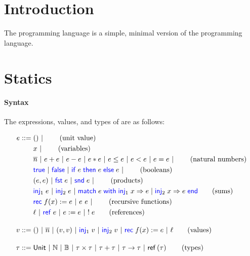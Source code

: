 \documentclass[10pt]{scrartcl}
\begin{document}

\author{Amin Timany}
\title{\miniML{}}

\maketitle

\section{Introduction}
\label{sec:intro}
The programming language \miniML{} is a simple, minimal version of the \ML{} programming language.

\section{Statics}
\label{sec:statics}

\paragraph{Syntax}
The expressions, values, and types of \miniML{} are as follows:

\begin{align*}
  \expr \BNFdef{}
  & \TT \ALT \tag{unit value} \\
  & \var \ALT \tag{variables} \\
  & \Num{n} \ALT \expr + \expr \ALT \expr - \expr \ALT \expr * \expr \ALT \expr \le \expr \ALT \expr < \expr \ALT \expr = \expr \ALT \tag{natural numbers}\\
  & \True \ALT \False \ALT \If \expr then \expr\; \Else \expr \ALT \tag{booleans} \\
  & (\expr, \expr) \ALT \Fst \expr \ALT \Snd \expr \ALT \tag{products} \\
  & \Inj{1} \expr \ALT \Inj{2} \expr \ALT \Match \expr with \Inj{1} \var => \expr | \Inj{2} \var => \expr end \tag{sums}\\
  & \Rec f \var := \expr \ALT \expr~\expr \ALT \tag{recursive functions}\\
  & \loc \ALT \alloc \expr \ALT \expr \store \expr \ALT \deref \expr \tag{references}\\[1em]
  \val \BNFdef{}
  & \TT \ALT \Num{n} \ALT (\val, \val) \ALT \Inj{1} \val \ALT \Inj{2} \val \ALT \Rec f \var := \expr \ALT \loc \tag{values}\\[1em]
  \typ \BNFdef{}
  & \Tunit \ALT \Tnat \ALT \Tbool \ALT \typ \times \typ \ALT \typ + \typ \ALT \typ \to \typ \ALT \Tref{\typ} \tag{types}
\end{align*}
\end{document}
